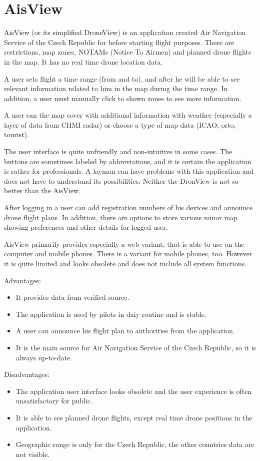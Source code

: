\section{AisView}\label{sec:aisview}
AisView (or its simplified DroneView) is an application created Air Navigation Service of the Czech Republic for before starting flight purposes.
There are restrictions, map zones, NOTAMs (Notice To Airmen) and planned drone flights in the map.
It has no real time drone location data.

A user sets flight a time range (from and to), and after he will be able to see relevant information related to him in the map during the time range.
In addition, a user must manually click to shown zones to see more information.

A user can the map cover with additional information with weather (especially a layer of data from CHMI radar) or choose a type of map data (ICAO, orto, tourist).

The user interface is quite unfriendly and non-intuitive in some cases.
The buttons are sometimes labeled by abbreviations, and it is certain the application is rather for professionals.
A layman can have problems with this application and does not have to understand its possibilities.
Neither the DronView is not so better than the AisView.

After logging in a user can add registration numbers of his devices and announce drone flight plans.
In addition, there are options to store various minor map showing preferences and other details for logged user.

AisView primarily provides especially a web variant, that is able to use on the computer and mobile phones.
There is a variant for mobile phones, too.
However it is quite limited and looks obsolete and does not include all system functions.

Advantages:
\begin{itemize}
    \item It provides data from verified source.
    \item The application is used by pilots in daiy routine and is stable.
    \item A user can announce his flight plan to authorities from the application.
    \item It is the main source for Air Navigation Service of the Czech Republic, so it is always up-to-date.
\end{itemize}
Disadvantages:
\begin{itemize}
    \item The application user interface looks obsolete and the user experience is often unsatisfactory for public.
    \item It is able to see planned drone flights, except real time drone positions in the application.
    \item Geographic range is only for the Czech Republic, the other countries data are not visible.
\end{itemize}
